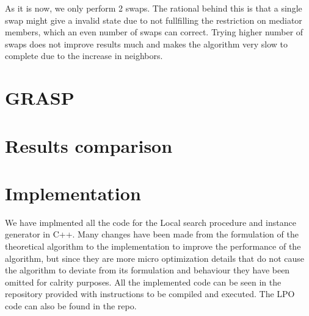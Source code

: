 \documentclass{article}
\begin{document}
As it is now, we only perform 2 swaps. The rational behind this is that a single swap might give a invalid state due to not fullfilling the restriction on mediator members, which an even number of swaps can correct. Trying higher number of swaps does not improve results much and makes the algorithm very slow to complete due to the increase in neighbors.

\section{GRASP}
\section{Results comparison}

\section{Implementation}
We have implmented all the code for the Local search procedure and instance generator in C++. Many changes have been made from the formulation of the theoretical algorithm to the implementation to improve the performance of the algorithm, but since they are more micro optimization details that do not cause the algorithm to deviate from its formulation and behaviour they have been omitted for calrity purposes.
All the implemented code can be seen in the repository provided with instructions to be compiled and executed.
The LPO code can also be found in the repo.
\end{document}
